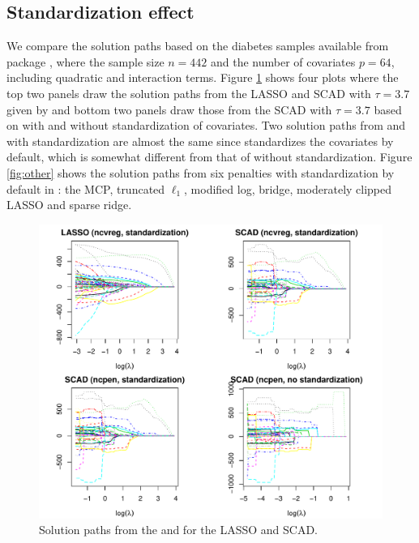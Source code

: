 \subsection{Standardization effect}
We compare the solution paths based on the diabetes samples available from  package \citep{efron2004least},
where the sample size $n=442$ and the number of covariates $p=64$, including quadratic and interaction terms.
Figure \ref{fig:stand} shows four plots where the top two panels draw the solution paths from the LASSO and SCAD with $\tau=3.7$ given by 
and bottom two panels draw those from the SCAD with $\tau=3.7$ based on  with and without standardization of covariates.
Two solution paths from  and  with standardization are almost the same
since  standardizes the covariates by default, which is somewhat different from that of  without standardization.
Figure \ref{fig:other} shows the solution paths from six penalties with standardization by default in :
the MCP, truncated $\ell_1$, modified log, bridge, moderately clipped LASSO and sparse ridge.

\begin{figure}[htbp]
  \centering
  \includegraphics[width=\linewidth]{diabetes-scad}
  \caption{Solution paths from the  and  for the LASSO and SCAD.}
  \label{fig:stand}
\end{figure}

